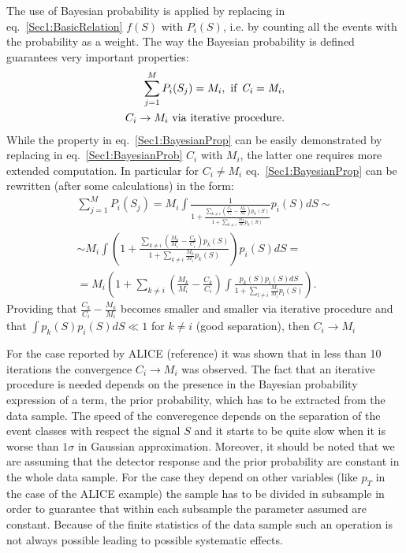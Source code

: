 The use of Bayesian probability is applied by replacing in eq.~\ref{Sec1:BasicRelation} $f(S)$ with $P_{i}(S)$, i.e. by counting all the events with the probability as a weight. The way the Bayesian probability is defined guarantees very important properties:
\begin{eqnarray}
\label{Sec1:BayesianProp}
\sum\limits_{j=1}^{M}P_{i}(S_j) = M_{i},{\rm\ if\ {\it C_{i} = M_{i}}}, \\
\label{Sec1:BayesianProp2}
C_{i} \rightarrow M_{i} {\rm\ via\ iterative\ procedure}.
\end{eqnarray}
While the property in eq.~\ref{Sec1:BayesianProp} can be easily demonstrated by replacing in eq.~\ref{Sec1:BayesianProb}  $C_{i}$ with $M_{i}$, the latter one requires more extended computation.
In particular for $C_{i} \neq M_{i}$ eq.~\ref{Sec1:BayesianProp} can be rewritten (after some calculations) in the form:
\begin{eqnarray}
\label{Sec1:BayesFullCalc}
\sum\limits_{j=1}^{M}P_{i}(S_j) = M_{i} \int \frac{1}{1+\frac{\sum\limits_{k \neq i} \left( \frac{C_k}{C_i} - \frac{M_k}{M_i} \right) p_{k}(S)}{1 + \sum\limits_{k \neq i} \frac{M_k}{M_i} p_k(S)}} p_{i}(S)dS \sim \\
\sim M_{i} \int  \left( 1+\frac{\sum\limits_{k \neq i} \left( \frac{M_k}{M_i} - \frac{C_k}{C_i} \right) p_{k}(S)}{1 + \sum\limits_{k \neq i} \frac{M_k}{M_i} p_k(S)} \right) p_{i}(S)dS = \\
= M_{i}  \left( 1 + \sum\limits_{k \neq i}  \left( \frac{M_k}{M_i} - \frac{C_k}{C_i} \right) \int  \frac{p_{k}(S)p_{i}(S)dS}{1+\sum\limits_{l \neq i} \frac{M_l}{M_i} p_l(S)} \right).
\end{eqnarray}
Providing that $\frac{C_k}{C_i} - \frac{M_k}{M_i}$ becomes smaller and smaller via iterative procedure and that $\int p_{k}(S)p_{i}(S)dS \ll 1$ for $k \neq i$ (good separation), then $C_i \rightarrow M_i$

For the case reported by ALICE (reference) it was shown that in less than 10 iterations the convergence $C_{i} \rightarrow M_{i}$ was observed.
The fact that an iterative procedure is needed depends on the presence in the Bayesian probability expression of a term, the prior probability, which has to be extracted from the data sample. The speed of the converegence depends on the separation of the event classes with respect the signal $S$ and it starts to be quite slow when it is worse than $1\sigma$ in Gaussian approximation.
Moreover, it should be noted that we are assuming that the detector response and the prior probability are constant in the whole data sample.
For the case they depend on other variables (like $p_{T}$ in the case of the ALICE example) the sample has to be divided in subsample in order to guarantee that within each subsample the parameter assumed are constant. Because of the finite statistics of the data sample such an operation is not always possible leading to possible systematic effects.

